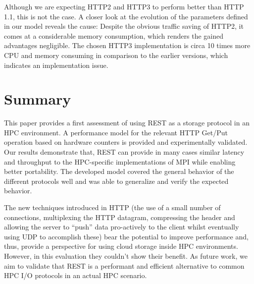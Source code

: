 \documentclass[runningheads]{llncs}
\begin{document}
Although we are expecting HTTP2 and HTTP3 to perform better than HTTP 1.1, this is not the case. A closer look at the evolution of the parameters defined in our model reveals the cause:
Despite the obvious traffic saving of HTTP2, it comes at a considerable memory consumption, which renders the gained advantages negligible. The chosen HTTP3 implementation is circa 10 times more CPU and memory consuming in comparison to the earlier versions, which indicates an implementation issue.

\section{Summary}
This paper provides a first assessment of using REST as a storage protocol in an HPC environment. A performance model for the relevant HTTP Get/Put operation based on hardware counters is provided and experimentally validated.
Our results demonstrate that, REST can provide in many cases similar latency and throughput to the HPC-specific implementations of MPI while enabling better portability.
The developed model covered the general behavior of the different protocols well and was able to generalize and verify the expected behavior. 

The new techniques introduced in HTTP (the use of a small number of connections, multiplexing the HTTP datagram, compressing the header and allowing the server to “push” data pro-actively to the client whilst eventually using UDP to accomplish these) bear the potential to improve performance and, thus, provide a perspective for using cloud storage inside HPC environments.
However, in this evaluation they couldn't show their benefit.
As future work, we aim to validate that REST is a performant and efficient alternative to common HPC I/O protocols in an actual HPC scenario.

\nocite{*}
%
%
%





\end{document}
